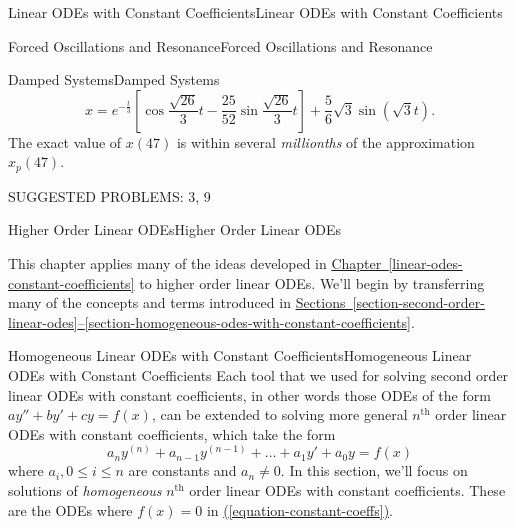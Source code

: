 \documentclass[10pt,]{book}
\numberwithin{equation}{section}
\renewcommand{\th}{\text{th}}
\begin{document}
\begin{chapterptx}{Linear ODEs with Constant Coefficients}{}{Linear ODEs with Constant Coefficients}{}{}
\begin{sectionptx}{Forced Oscillations and Resonance}{}{Forced Oscillations and Resonance}{}{}
\begin{subsectionptx}{Damped Systems}{}{Damped Systems}{}{}
\begin{equation*}
x = e^{-\frac{t}{3}}\left[\cos\frac{\sqrt{26}}{3}t - \frac{25}{52}\sin\frac{\sqrt{26}}{3}t\right] + \frac{5}{6}\sqrt{3}\sin(\sqrt{3}t).
\end{equation*}
The exact value of \(x(47)\) is within several \emph{millionths} of the approximation \(x_{p}(47)\).%
\end{subsectionptx}
\begin{conclusion}{}%
\hypertarget{p-258}{}%
SUGGESTED PROBLEMS: 3, 9%
\end{conclusion}%
\end{sectionptx}
\end{chapterptx}
%
%
\typeout{************************************************}
\typeout{************************************************}
%
\begin{chapterptx}{Higher Order Linear ODEs}{}{Higher Order Linear ODEs}{}{}\label{higher-order-linear-odes}
\begin{introduction}{}%
\hypertarget{p-259}{}%
This chapter applies many of the ideas developed in \hyperref[linear-odes-constant-coefficients]{Chapter~\ref{linear-odes-constant-coefficients}} to higher order linear ODEs. We'll begin by transferring many of the concepts and terms introduced in \hyperref[section-second-order-linear-odes]{Sections~\ref{section-second-order-linear-odes}--\ref{section-homogeneous-odes-with-constant-coefficients}}.%
\end{introduction}%
%
%
\typeout{************************************************}
\typeout{************************************************}
%
\begin{sectionptx}{Homogeneous Linear ODEs with Constant Coefficients}{}{Homogeneous Linear ODEs with Constant Coefficients}{}{}\label{section-homogeneous-linear-odes-with-constant-coefficients}
\hypertarget{p-260}{}%
Each tool that we used for solving second order linear ODEs with constant coefficients, in other words those ODEs of the form \(ay''+by'+cy=f(x)\), can be extended to solving more general \(n^{\text{th}}\) order linear ODEs with constant coefficients, which take the form%
\begin{equation}
a_{n}y^{(n)}+a_{n-1}y^{(n-1)}+\dots+a_{1}y'+a_{0}y=f(x)\label{equation-constant-coeffs}
\end{equation}
where \(a_{i},0\leq i\leq n\) are constants and \(a_{n}\neq0\). In this section, we'll focus on solutions of \textit{homogeneous} \(n^{\th}\) order linear ODEs with constant coefficients. These are the ODEs where \(f(x) = 0\) in \hyperref[equation-constant-coeffs]{(\ref{equation-constant-coeffs})}.%

\end{sectionptx}
\end{chapterptx}
\end{document}
